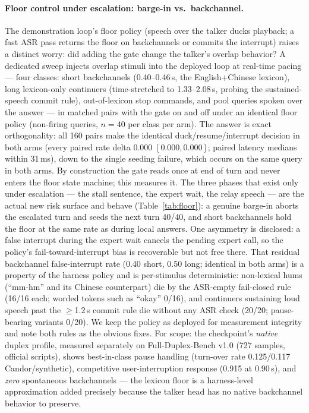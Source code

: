 \paragraph{Floor control under escalation: barge-in vs.\ backchannel.}
The demonstration loop's floor policy (speech over the talker ducks
playback; a fast ASR pass returns the floor on backchannels or commits
the interrupt) raises a distinct worry: did adding the gate change the
talker's overlap behavior? A dedicated sweep injects overlap stimuli
into the deployed loop at real-time pacing --- four classes: short
backchannels (0.40--0.46\,s, the English+Chinese lexicon), long
lexicon-only continuers (time-stretched to 1.33--2.08\,s, probing the
sustained-speech commit rule), out-of-lexicon stop commands, and pool
queries spoken over the answer --- in matched pairs with the gate on
and off under an identical floor policy (non-firing queries, $n{=}40$
per class per arm). The answer is exact orthogonality: all 160 pairs
make the identical duck/resume/interrupt decision in both arms (every
paired rate delta $0.000$ $[0.000,0.000]$; paired latency medians
within 31\,ms), down to the single seeding failure, which occurs on
the same query in both arms. By construction the gate reads once at
end of turn and never enters the floor state machine; this measures
it. The three phases that exist only under escalation --- the stall
sentence, the expert wait, the relay speech --- are the actual new
risk surface and behave (Table~\ref{tab:floor}): a genuine barge-in
aborts the escalated turn and seeds the next turn 40/40, and short
backchannels hold the floor at the same rate as during local answers.
One asymmetry is disclosed: a false interrupt during the expert wait
cancels the pending expert call, so the policy's fail-toward-interrupt
bias is recoverable but not free there. That residual backchannel
false-interrupt rate (0.40 short, 0.50 long; identical in both arms)
is a property of the harness policy and is per-stimulus deterministic:
non-lexical hums (``mm-hm'' and its Chinese counterpart) die by the
ASR-empty fail-closed rule (16/16 each; worded tokens such as
``okay'' 0/16), and continuers sustaining loud speech past the
$\ge$1.2\,s commit rule die without any ASR check (20/20;
pause-bearing variants 0/20). We keep the policy as deployed for
measurement integrity and note both rules as the obvious fixes. For
scope: the checkpoint's \emph{native} duplex profile, measured
separately on Full-Duplex-Bench v1.0 \citep{lin2025fdb} (727 samples,
official scripts), shows best-in-class pause handling (turn-over rate
0.125/0.117 Candor/synthetic), competitive user-interruption response
(0.915 at 0.90\,s), and \emph{zero} spontaneous backchannels --- the
lexicon floor is a harness-level approximation added precisely because
the talker head has no native backchannel behavior to preserve.

